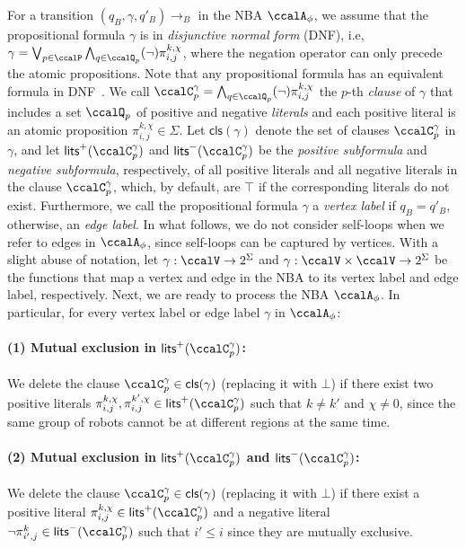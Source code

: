 \documentclass[Afour,sageh,times]{sagej}
\newcommand{\cp}[2]{\ccalC_{#1}^{#2}}
\newcommand{\autop}{\ccalA_{\phi}}
\renewcommand{\ap}[3]{\mathcal{\pi}_{{#1},{#2}}^{#3}}
\begin{document}
For a transition $(q_B, \gamma, q'_B)\to_B$ in the NBA $\autop$, we assume that the propositional formula $\gamma$ is  in {\it disjunctive normal form} (DNF), i.e,
$ \gamma = \bigvee_{p\in \ccalP} \bigwedge_{q\in \ccalQ_p} (\neg)\ap{i}{j}{k,\chi}$, where the negation operator can only precede the atomic propositions. Note that any propositional formula has an equivalent formula in DNF~\citep{baier2008principles}. We call  $\ccalC_p^{\gamma}=\bigwedge_{q\in \ccalQ_p}(\neg) \ap{i}{j}{k,\chi}$ the $p$-th {\it clause} of $\gamma$ that includes a set $\ccalQ_p$ of positive and negative {\it literals} and each positive literal is an atomic proposition $\ap{i}{j}{k,\chi}\in \Sigma$. Let $\mathsf{cls}(\gamma)$ denote the set of clauses $\ccalC_p^{\gamma}$ in $\gamma$, and let $\mathsf{lits}^+(\ccalC_p^{\gamma})$ and $\mathsf{lits}^-(\ccalC_p^{\gamma})$ be the {\it positive subformula} and {\it negative  subformula}, respectively,  of all positive literals and all negative literals in the clause $\ccalC_p^\gamma$, which, by default, are $\top$ if the corresponding literals do not exist. Furthermore, we call the propositional formula $\gamma$ a {\it vertex label} if $q_B=q'_B$, otherwise, an {\it edge label}. In what follows, we do not consider self-loops when we refer to edges in $\autop$, since self-loops can be captured by vertices.   With a slight abuse of notation, let {$\gamma: \ccalV \to  2^\Sigma $} and {$\gamma: \ccalV \times \ccalV \to 2^\Sigma$} be the functions that map a vertex and edge in the NBA to its vertex label and edge label, respectively. Next, we are ready to process the NBA $\autop$.  In particular, for every vertex label or edge label $\gamma$ in $\autop$:
\paragraph{(1) Mutual exclusion in $\mathsf{lits}^+(\cp{p}{\gamma})$:}\label{prune:exclusion1} We delete the clause $\cp{p}{\gamma} \in \mathsf{cls}(\gamma)$ (replacing it with $\bot$) if there exist two positive literals $\ap{i}{j}{k,\chi}, \ap{i}{j}{k',\chi} \in \mathsf{lits}^+(\cp{p}{\gamma})$ such that $k\not= k'$ and $\chi\not=0$, since the same group of robots cannot be at different regions at the same time.
 \paragraph{(2) Mutual exclusion in $\mathsf{lits}^+(\cp{p}{\gamma})$  and $\mathsf{lits}^-(\cp{p}{\gamma})$:} \label{prune:exclusion2} We delete the clause $\cp{p}{\gamma} \in \mathsf{cls}(\gamma)$ (replacing it with $\bot$) if there exist a positive literal $\ap{i}{j}{k,\chi} \in \mathsf{lits}^+(\cp{p}{\gamma})$ and a negative literal $\neg \ap{i'}{j}{k} \in \mathsf{lits}^-(\cp{p}{\gamma})$ such that $i' \leq i$ since they are mutually  exclusive.
\end{document}
